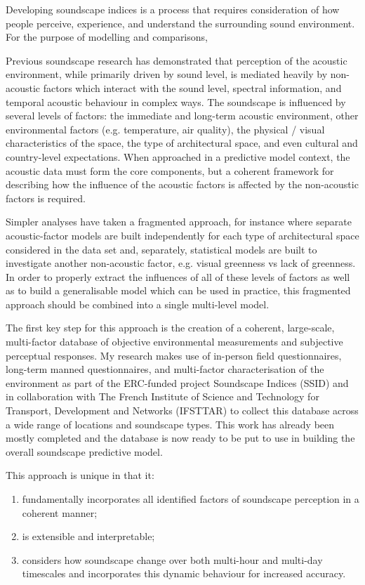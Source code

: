 Developing soundscape indices is a process that requires consideration of how people perceive, experience, and understand the surrounding sound environment. For the purpose of modelling and comparisons,

Previous soundscape research has demonstrated that perception of the acoustic environment, while primarily driven by sound level, is mediated heavily by non-acoustic factors which interact with the sound level, spectral information, and temporal acoustic behaviour in complex ways. The soundscape is influenced by several levels of factors: the immediate and long-term acoustic environment, other environmental factors (e.g. temperature, air quality), the physical / visual characteristics of the space, the type of architectural space, and even cultural and country-level expectations. When approached in a predictive model context, the acoustic data must form the core components, but a coherent framework for describing how the influence of the acoustic factors is affected by the non-acoustic factors is required.

Simpler analyses have taken a fragmented approach, for instance where separate acoustic-factor models are built independently for each type of architectural space considered in the data set and, separately, statistical models are built to investigate another non-acoustic factor, e.g. visual greenness vs lack of greenness. In order to properly extract the influences of all of these levels of factors as well as to build a generalisable model which can be used in practice, this fragmented approach should be combined into a single multi-level model.

The first key step for this approach is the creation of a coherent, large-scale, multi-factor database of objective environmental measurements and subjective perceptual responses. My research makes use of in-person field questionnaires, long-term manned questionnaires, and multi-factor characterisation of the environment as part of the ERC-funded project Soundscape Indices (SSID) and in collaboration with The French Institute of Science and Technology for Transport, Development and Networks (IFSTTAR) to collect this database across a wide range of locations and soundscape types. This work has already been mostly completed and the database is now ready to be put to use in building the overall soundscape predictive model.

This approach is unique in that it:
\begin{enumerate}
  \item fundamentally incorporates all identified factors of soundscape perception in a coherent manner;
  \item is extensible and interpretable;
  \item considers how soundscape change over both multi-hour and multi-day timescales and incorporates this dynamic behaviour for increased accuracy.
\end{enumerate}

